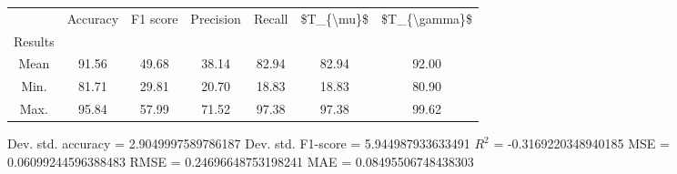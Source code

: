 \begin{tabular}{|c|c|c|c|c|c|c|}
\toprule
{} &  Accuracy &  F1 score &  Precision &  Recall &  \$T\_\{\textbackslash mu\}\$ &  \$T\_\{\textbackslash gamma\}\$ \\
Results &           &           &            &         &            &               \\
\hline
Mean    &     91.56 &     49.68 &      38.14 &   82.94 &      82.94 &         92.00 \\
Min.    &     81.71 &     29.81 &      20.70 &   18.83 &      18.83 &         80.90 \\
Max.    &     95.84 &     57.99 &      71.52 &   97.38 &      97.38 &         99.62 \\
\bottomrule
\end{tabular}

 Dev. std. accuracy = 2.9049997589786187
 Dev. std. F1-score = 5.944987933633491
 $R^2$ = -0.3169220348940185
 MSE = 0.06099244596388483
 RMSE = 0.24696648753198241
 MAE = 0.08495506748438303